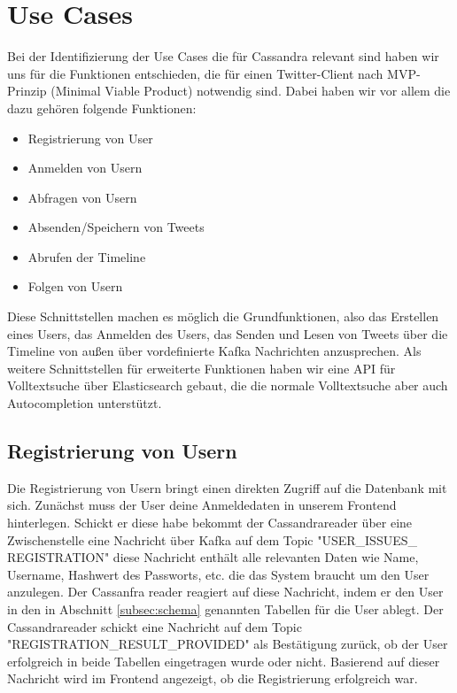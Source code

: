 \section{Use Cases}
\label{sec:usecase}
Bei der Identifizierung der Use Cases die für Cassandra relevant sind haben wir uns für die Funktionen entschieden, die für einen Twitter-Client nach MVP-Prinzip (Minimal Viable Product) notwendig sind. Dabei haben wir vor allem die dazu gehören folgende Funktionen:
\begin{itemize}
	\item Registrierung von User
	\item Anmelden von Usern
	\item Abfragen von Usern
	\item Absenden/Speichern von Tweets
	\item Abrufen der Timeline
	\item Folgen von Usern
\end{itemize}
Diese Schnittstellen machen es möglich die Grundfunktionen, also das Erstellen eines Users, das Anmelden des Users, das Senden und Lesen von Tweets über die Timeline von außen über vordefinierte Kafka Nachrichten anzusprechen.
Als weitere Schnittstellen für erweiterte Funktionen haben wir eine API für Volltextsuche über Elasticsearch gebaut, die die normale Volltextsuche aber auch Autocompletion unterstützt.\\ 

\subsection{Registrierung von Usern}
Die Registrierung von Usern bringt einen direkten Zugriff auf die Datenbank mit sich. Zunächst muss der User deine Anmeldedaten in unserem Frontend hinterlegen. Schickt er diese habe bekommt der Cassandrareader über eine Zwischenstelle eine Nachricht über Kafka auf dem Topic "USER\_ISSUES\_ REGISTRATION" diese Nachricht enthält alle relevanten Daten wie Name, Username, Hashwert des Passworts, etc. die das System braucht um den User anzulegen. Der Cassanfra reader reagiert auf diese Nachricht, indem er den User in den in Abschnitt \ref{subsec:schema} genannten Tabellen für die User ablegt. Der Cassandrareader schickt eine Nachricht auf dem Topic "REGISTRATION\_RESULT\_PROVIDED" als Bestätigung zurück, ob der User erfolgreich in beide Tabellen eingetragen wurde oder nicht. Basierend auf dieser Nachricht wird im Frontend angezeigt, ob die Registrierung erfolgreich war.

